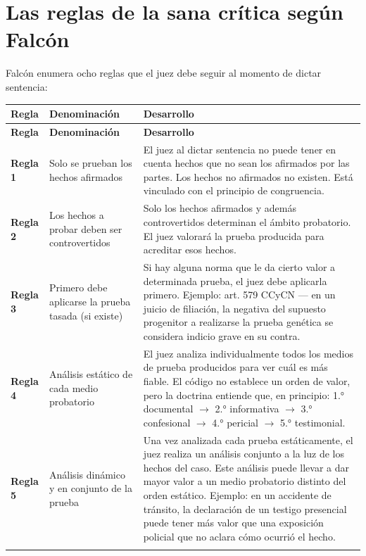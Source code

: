 \documentclass[12pt,oneside]{book}
\begin{document}
\section{Las reglas de la sana crítica según Falcón}

Falcón enumera ocho reglas que el juez debe seguir al momento de dictar sentencia:

\begin{longtable}{>{\raggedright\arraybackslash}p{} >{\raggedright\arraybackslash}p{} >{\raggedright\arraybackslash}X}
\toprule
\textbf{Regla} & \textbf{Denominación} & \textbf{Desarrollo} \\
\midrule
\endfirsthead
\toprule
\textbf{Regla} & \textbf{Denominación} & \textbf{Desarrollo} \\
\midrule
\endhead
\bottomrule
\endfoot

\textbf{Regla 1} & Solo se prueban los hechos afirmados & El juez al dictar sentencia no puede tener en cuenta hechos que no sean los afirmados por las partes. Los hechos no afirmados no existen. Está vinculado con el principio de congruencia. \\
\addlinespace

\textbf{Regla 2} & Los hechos a probar deben ser controvertidos & Solo los hechos afirmados y además controvertidos determinan el ámbito probatorio. El juez valorará la prueba producida para acreditar esos hechos. \\
\addlinespace

\textbf{Regla 3} & Primero debe aplicarse la prueba tasada (si existe) & Si hay alguna norma que le da cierto valor a determinada prueba, el juez debe aplicarla primero. Ejemplo: art. 579 CCyCN --- en un juicio de filiación, la negativa del supuesto progenitor a realizarse la prueba genética se considera indicio grave en su contra. \\
\addlinespace

\textbf{Regla 4} & Análisis estático de cada medio probatorio & El juez analiza individualmente todos los medios de prueba producidos para ver cuál es más fiable. El código no establece un orden de valor, pero la doctrina entiende que, en principio: 1.° documental $\to$ 2.° informativa $\to$ 3.° confesional $\to$ 4.° pericial $\to$ 5.° testimonial. \\
\addlinespace

\textbf{Regla 5} & Análisis dinámico y en conjunto de la prueba & Una vez analizada cada prueba estáticamente, el juez realiza un análisis conjunto a la luz de los hechos del caso. Este análisis puede llevar a dar mayor valor a un medio probatorio distinto del orden estático. Ejemplo: en un accidente de tránsito, la declaración de un testigo presencial puede tener más valor que una exposición policial que no aclara cómo ocurrió el hecho. \\
\addlinespace


\end{longtable}
\end{document}
